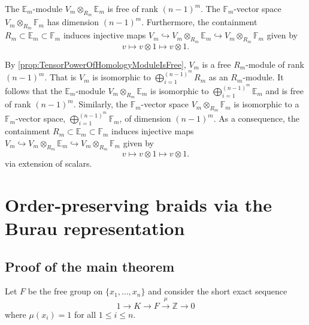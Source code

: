 \documentclass{amsart}
\makeatletter
\renewenvironment{proof}[1][\proofname]{%
   \par\pushQED{\qed}\normalfont%
   \topsep6\p@\@plus6\p@\relax
   \trivlist\item[\hskip\labelsep\bfseries#1\@addpunct{.}]%
   \ignorespaces
}{%
   \popQED\endtrivlist\@endpefalse
}
\makeatother
\begin{document}
\begin{cor}
    \label{cor:ExtensionOfScalarsForV_m}
    The $\mathbb{E}_m$-module $V_m \otimes_{R_m} \mathbb{E}_m$ is free of rank $(n-1)^m$. The $\mathbb{F}_m$-vector space $V_m \otimes_{R_m} \mathbb{F}_m$ has dimension $(n-1)^m$. Furthermore, the containment $R_m \subset \mathbb{E}_m \subset \mathbb{F}_m $ induces injective maps $V_m \hookrightarrow V_m \otimes_{R_m} \mathbb{E}_m \hookrightarrow V_m \otimes_{R_m} \mathbb{F}_m$ given by
    \[
    v \longmapsto v\otimes 1 \longmapsto v \otimes 1.
    \]
\end{cor}

\begin{proof}
    By \cref{prop:TensorPowerOfHomologyModuleIsFree}, $V_m$ is a free $R_m$-module of rank $(n-1)^m$. That is $V_m$ is isomorphic to $\bigoplus\limits_{i=1}^{(n-1)^m}R_m$ as an $R_m$-module. It follows that the $\mathbb{E}_m$-module $V_m \otimes_{R_m} \mathbb{E}_m$ is isomorphic to  $\bigoplus\limits_{i=1}^{(n-1)^m}\mathbb{E}_m$ and is free of rank $(n-1)^m$. Similarly, the $\mathbb{F}_m$-vector space $V_m \otimes_{R_m} \mathbb{F}_m$ is isomorphic to a $\mathbb{F}_m$-vector space, $\bigoplus\limits_{i=1}^{(n-1)^m}\mathbb{F}_m$, of dimension $(n-1)^m$. As a consequence, the containment $R_m \subset \mathbb{E}_m \subset \mathbb{F}_m $ induces injective maps $V_m \hookrightarrow V_m \otimes_{R_m} \mathbb{E}_m \hookrightarrow V_m \otimes_{R_m} \mathbb{F}_m$ given by
    \[
    v \longmapsto v\otimes 1 \longmapsto v \otimes 1.
    \]
    via extension of scalars. 
\end{proof}

\section{Order-preserving braids via the Burau representation}
\subsection{Proof of the main theorem}
\label{subsec:ProofMainTheorem}
Let $F$ be the free group on $\{x_1,\dots, x_n\}$ and consider the short exact sequence
\[
1 \to K \to F \xrightarrow{\mu} \mathbb{Z} \to 0
\]
where $\mu(x_i) = 1$ for all $1\leq i \leq n$. 
\end{document}
